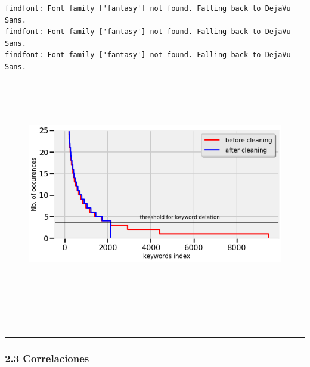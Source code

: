     \begin{Verbatim}[commandchars=\\\{\}]
findfont: Font family ['fantasy'] not found. Falling back to DejaVu Sans.
findfont: Font family ['fantasy'] not found. Falling back to DejaVu Sans.
findfont: Font family ['fantasy'] not found. Falling back to DejaVu Sans.
\end{Verbatim}

\begin{figure}[h]
    \centering
    \captionsetup{width=10cm}
    \includegraphics[height=10cm]{./contenido/imagenes/output_64_1.png}
\end{figure}

    { \hspace*{\fill} \\}
    
    \begin{center}\rule{0.5\linewidth}{\linethickness}\end{center}

\subsubsection{2.3 Correlaciones}\label{correlaciones}

